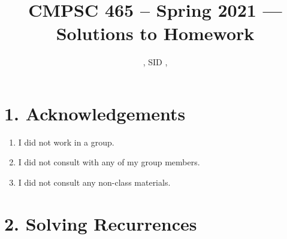 \documentclass[11pt]{article}
\title{CMPSC 465 -- Spring 2021 --- Solutions to Homework \Homework}
\author{\Name, SID \SID, \texttt{\Login}}
\newenvironment{qparts}{\begin{enumerate}[{(}a{)}]}{\end{enumerate}}
\begin{document}
\maketitle

\section*{1. Acknowledgements}
\begin{qparts}
\item
I did not work in a group.
\item
I did not consult with any of my group members.
\item
I did not consult any non-class materials.
\end{qparts}

\newpage
\section*{2. Solving Recurrences}
\end{document}

